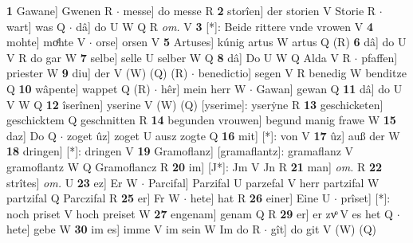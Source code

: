 \documentclass[8pt,a4paper,notitlepage]{article}
\begin{document}
\begin{table}[ht]
\begin{minipage}[t]{0.5\linewidth}
\textbf{1} Gawane] Gwenen R  $\cdot$ messe] do messe R \textbf{2} storîen] der storien V Storie R  $\cdot$ wart] was Q  $\cdot$ dâ] do U W Q R \textit{om.} V \textbf{3} [*]: Beide rittere vnde vrowen V \textbf{4} mohte] moͤhte V  $\cdot$ orse] orsen V \textbf{5} Artuses] kúnig artus W artus Q (R) \textbf{6} dâ] do U V R do gar W \textbf{7} selbe] selle U selber W Q \textbf{8} dâ] Do U W Q Alda V R  $\cdot$ pfaffen] priester W \textbf{9} diu] der V (W) (Q) (R)  $\cdot$ benedictio] segen V R benedig W benditze Q \textbf{10} wâpente] wappet Q (R)  $\cdot$ hêr] mein herr W  $\cdot$ Gawan] gewan Q \textbf{11} dâ] do U V W Q \textbf{12} îserînen] yserine V (W) (Q) [yserime]: yserẏne  R \textbf{13} geschicketen] geschicktem Q geschnitten R \textbf{14} begunden vrouwen] begund manig frawe W \textbf{15} daz] Do Q  $\cdot$ zoget ûz] zoget U ausz zogte Q \textbf{16} mit] [*]: von V \textbf{17} ûz] auß der W \textbf{18} dringen] [*]: dringen V \textbf{19} Gramoflanz] [gramaflantz]: gramaflanz V gramoflantz W Q Gramoflancz R \textbf{20} im] [J*]: Jm V Jn R \textbf{21} man] \textit{om.} R \textbf{22} strîtes] \textit{om.} U \textbf{23} ez] Er W  $\cdot$ Parcifal] Parzifal U parzefal V herr partzifal W partzifal Q Parczifal R \textbf{25} er] Fr W  $\cdot$ hete] hat R \textbf{26} einer] Eine U  $\cdot$ prîset] [*]: noch priset V hoch preiset W \textbf{27} engenam] genam Q R \textbf{29} er] er zvͦ V es het Q  $\cdot$ hete] gebe W \textbf{30} im es] imme V im sein W Im do R  $\cdot$ gît] do git V (W) (Q) \newline
\end{minipage}
\end{table}
\end{document}
